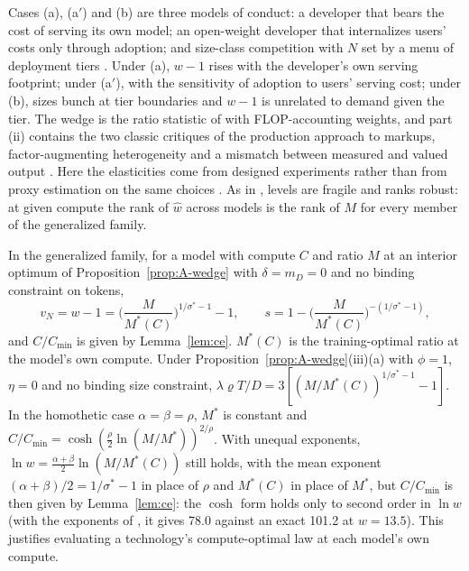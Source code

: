 \begin{remark}\label{rem:A-conduct}
Cases (a), (a$'$) and (b) are three models of conduct: a developer that bears the cost of serving its own model; an
open-weight developer that internalizes users' costs only through adoption; and size-class competition with $N$ set by a
menu of deployment tiers \citep[compare the Leontief model of][in which over-training does not arise]{hao2026theory}.
Under (a), $w-1$ rises with the developer's own serving footprint; under (a$'$), with the sensitivity of adoption to users'
serving cost; under (b), sizes bunch at tier boundaries and $w-1$ is unrelated to demand given the tier. The wedge is the
ratio statistic of \citet{raval2023testing} with FLOP-accounting weights, and part (ii) contains the two classic critiques
of the production approach to markups, factor-augmenting heterogeneity \citep{demirer2020production} and a mismatch between
measured and valued output \citep{bond2020unpleasant}. Here the elasticities come from designed experiments rather than
from proxy estimation on the same choices \citep{doraszelski2021reexamining}. As in \citet{deridder2026hitchhiker}, levels
are fragile and ranks robust: at given compute the rank of $\hat w$ across models is the rank of $M$ for every member of the
generalized family.
\end{remark}

\begin{corollary}\label{cor:suff}
In the generalized family, for a model with compute $C$ and ratio $M$ at an interior optimum of
Proposition~\ref{prop:A-wedge} with $\delta=m_D=0$ and no binding constraint on tokens,
\[
v_N=w-1=\Big(\frac{M}{M^*(C)}\Big)^{1/\sigma^*-1}-1,\qquad s=1-\Big(\frac{M}{M^*(C)}\Big)^{-(1/\sigma^*-1)},
\]
and $C/C_{\min}$ is given by Lemma~\ref{lem:ce}. $M^*(C)$ is the training-optimal ratio at the model's own compute. Under
Proposition~\ref{prop:A-wedge}(iii)(a) with $\phi=1$, $\eta=0$ and no binding size constraint,
$\lambda\varrho T/D=3[(M/M^*(C))^{1/\sigma^*-1}-1]$. In the homothetic case $\alpha=\beta=\rho$, $M^*$ is constant and
$C/C_{\min}=\cosh(\tfrac\rho2\ln(M/M^*))^{2/\rho}$. With unequal exponents, $\ln w=\tfrac{\alpha+\beta}{2}\ln(M/M^*(C))$
still holds, with the mean exponent $(\alpha+\beta)/2=1/\sigma^*-1$ in place of $\rho$ and $M^*(C)$ in place of $M^*$, but
$C/C_{\min}$ is then given by Lemma~\ref{lem:ce}: the $\cosh$ form holds only to second order in $\ln w$ (with the
exponents of \citet{hoffmann2022training}, it gives 78.0 against an exact 101.2 at $w=13.5$). This justifies evaluating a
technology's compute-optimal law at each model's own compute.
\end{corollary}

